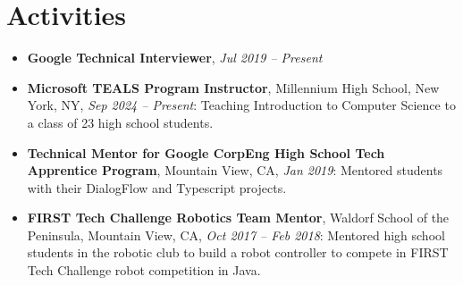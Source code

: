 \documentclass[letterpaper,11pt]{article}
\newcommand{\resumeItemBoldedTwo}[2]{
  \item\small{
    \textbf{#1}{, \textit{#2}\vspace{-4pt}}
  }
}
\newcommand{\resumeItemBoldedFour}[4]{
  \item\small{
    \textbf{#1}{, #2, \textit{#3}: #4 \vspace{-4pt}}
  }
}
\newcommand{\resumeSubHeadingListStart}{\begin{itemize}[leftmargin=*]}
\newcommand{\resumeSubHeadingListEnd}{\end{itemize}}
\begin{document}
\section{Activities}
  \resumeSubHeadingListStart
    \resumeItemBoldedTwo{Google Technical Interviewer}{Jul 2019 -- Present}
    \resumeItemBoldedFour{Microsoft TEALS Program Instructor}{Millennium High School, New York, NY}{Sep 2024 -- Present}{Teaching Introduction to Computer Science to a class of 23 high school students.}
    \resumeItemBoldedFour{Technical Mentor for Google CorpEng High School Tech Apprentice Program}{Mountain View, CA}{Jan 2019}{Mentored students with their DialogFlow and Typescript projects.}
    \resumeItemBoldedFour{FIRST Tech Challenge Robotics Team Mentor}{Waldorf School of the Peninsula, Mountain View, CA}{Oct 2017 -- Feb 2018}{Mentored high school students in the robotic club to build a robot controller to compete in FIRST Tech Challenge robot competition in Java.}
  \resumeSubHeadingListEnd

\end{document}
